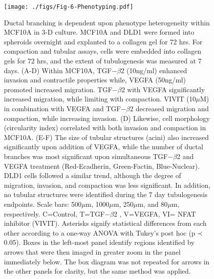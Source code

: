 \documentclass[12pt]{article}
\begin{document}
\clearpage

\begin{figure}
\texttt{[image: ./figs/Fig-6-Phenotyping.pdf]}
\caption{Ductal branching is dependent upon phenotype heterogeneity within MCF10A in 3-D culture.  MCF10A and DLD1 were formed into spheroids overnight and explanted to a collagen gel for 72 hrs.  For compaction and tubular assays, cells were embedded into collagen gels for 72 hrs, and the extent of tubulogenesis was measured at 7 days.  (A-D) Within MCF10A, TGF$-\beta$2 (10ng/ml) enhanced invasion and contractile properties while, VEGFA (50ng/ml) promoted increased migration.  TGF$-\beta$2 with VEGFA significantly increased migration, while limiting with compaction.  VIVIT (10$\mu$M) in combination with VEGFA and TGF$-\beta$2 decreased migration and compaction, while increasing invasion.  (D) Likewise, cell morphology (circularity index) correlated with both invasion and compaction in MCF10A.  (E-F) The size of tubular structures (acini) also increased significantly upon addition of VEGFA, while the number of ductal branches was most significant upon simultaneous TGF$-\beta$2 and VEGFA treatment (Red-Ecadherin, Green-Factin, Blue-Nuclear).   DLD1 cells followed a similar trend, although the degree of migration, invasion, and compaction was less significant.  In addition, no tubular structures were identified during the 7 day tubulogenesis endpoints.  Scale bars: 500$\mu$m, 1000$\mu$m, 250$\mu$m, and 80$\mu$m, respectively.  C=Control, T=TGF$-\beta$2 , V=VEGFA, VI= NFAT inhibitor (VIVIT).  Asterisks signify statistical differences from each other according to a one-way ANOVA with Tukey's post hoc (p$\prec$0.05).
Boxes in the left-most panel identify regions identified by arrows that were then imaged in greater zoom in the panel immediately below.
The box diagram was not repeated for arrows in the other panels for clarity, but the same method was applied.}\label{fg:F6}
\end{figure}

\clearpage

\renewcommand\thefigure{S\arabic{figure}}
\renewcommand\thetable{T\arabic{table}}
\renewcommand\thepage{S-\arabic{page}}
\renewcommand\theequation{S\arabic{equation}}

\setcounter{equation}{0}
\setcounter{table}{0}
\setcounter{figure}{0}
\setcounter{page}{1}

\clearpage

\end{document}
